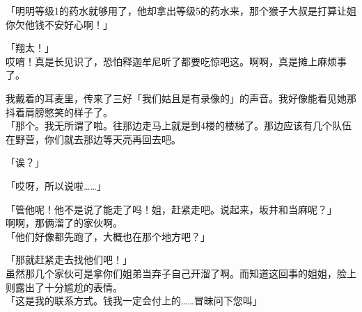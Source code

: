 「明明等级1的药水就够用了，他却拿出等级5的药水来，那个猴子大叔是打算让姐你欠他钱不安好心啊！」

「翔太！」\\

哎唷！真是长见识了，恐怕释迦牟尼听了都要吃惊吧这。啊啊，真是摊上麻烦事了。

我戴着的耳麦里，传来了三好「我们姑且是有录像的」的声音。我好像能看见她那抖着肩膀憋笑的样子了。\\

「那个。我无所谓了啦。往那边走马上就是到4楼的楼梯了。那边应该有几个队伍在野营，你们就去那边等天亮再回去吧。

「诶？」

「哎呀，所以说啦……」

「管他呢！他不是说了能走了吗！姐，赶紧走吧。说起来，坂井和当麻呢？」\\

啊啊，那俩溜了的家伙啊。\\

「他们好像都先跑了，大概也在那个地方吧？」

「那就赶紧走去找他们吧！」\\

虽然那几个家伙可是拿你们姐弟当弃子自己开溜了啊。而知道这回事的姐姐，脸上则露出了十分尴尬的表情。\\

「这是我的联系方式。钱我一定会付上的……冒昧问下您叫」

